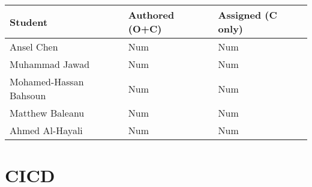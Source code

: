 \documentclass{article}
\begin{document}
\begin{table}[H]
\centering
\begin{tabular}{lll}
\toprule
\textbf{Student} & \textbf{Authored (O+C)} & \textbf{Assigned (C only)}\\
\midrule
Ansel Chen & Num & Num \\
Muhammad Jawad & Num & Num \\
Mohamed-Hassan Bahsoun & Num & Num \\
Matthew Baleanu & Num & Num \\
Ahmed Al-Hayali & Num & Num \\
\bottomrule
\end{tabular}
\end{table}


\section{CICD}


\end{document}

